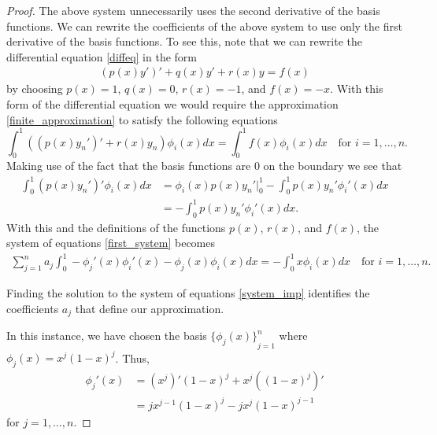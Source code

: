 \begin{proof}
  The above system unnecessarily uses the second derivative of the basis
  functions. We can rewrite the coefficients of the above system to use only
  the first derivative of the basis functions. To see this,
  note that we can rewrite the differential equation \eqref{diffeq} in the form
  \begin{align}\label{alternate_diffeq}
    (p(x)y')' + q(x)y' + r(x)y = f(x)
  \end{align}
  by choosing $p(x) = 1$, $q(x) = 0$, $r(x) = -1$, and $f(x) = -x$. With this form of the
  differential equation we would require the approximation \eqref{finite_approximation}
  to satisfy the following equations
  \[
    \int_0^1 ((p(x)y_n')' + r(x)y_n)\phi_i(x) dx = \int_0^1f(x)\phi_i(x)dx \quad \text{for $i=1,\dots,n$}.
  \]
  Making use of the fact that the basis functions are 0 on the boundary we see that
  \begin{align*}
    \int_0^1(p(x)y_n')'\phi_i(x) dx
    &= \phi_i(x)p(x)y_n'\rvert_0^1 - \int_0^1 p(x)y_n'\phi_i'(x) dx \\
    &= - \int_0^1 p(x)y_n'\phi_i'(x) dx.
  \end{align*}
  With this and the definitions of the functions $p(x)$, $r(x)$, and $f(x)$,
  the system of equations \eqref{first_system} becomes
  \begin{align}\label{system_imp}
    \sum_{j=1}^n a_j \int_0^1 -\phi_j'(x)\phi_i'(x) - \phi_j(x)\phi_i(x) dx = -\int_0^1 x \phi_i(x) dx \quad \text{for $i=1,\dots,n$}.
  \end{align}

  Finding the solution to the system of equations \eqref{system_imp} identifies
  the coefficients $a_j$ that define our approximation.

  In this instance, we have chosen the basis $\left.\{\phi_j(x)\}\right._{j=1}^n$ where $\phi_j(x) = x^j(1-x)^j$.
  Thus,
  \begin{align*}
    \phi_j'(x)
    &= \left(x^j\right)'(1-x)^j + x^j\left((1-x)^j\right)' \\
    &= jx^{j-1}(1-x)^j -jx^j(1-x)^{j-1}
  \end{align*}
  for $j=1,\dots,n$.
\end{proof}